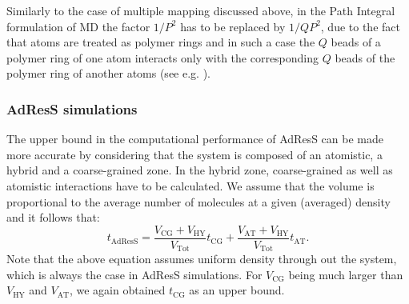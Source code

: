 \documentclass[a4paper,preprint,unsortedaddress]{revtex4-1}
\begin{document}
Similarly to the case of multiple mapping discussed above, in the Path Integral formulation of MD the factor $1/P^2$ has to be replaced by $1/QP^{2}$, due to the fact that atoms are treated as polymer rings and in such a case the $Q$ beads of a polymer ring of one atom interacts only with the corresponding $Q$ beads of the polymer ring of another atoms (see e.g. \cite{PI}).



\subsubsection{AdResS simulations}
The upper bound in the computational performance of AdResS  can be made more accurate by considering that the system is composed of an atomistic, a hybrid and a coarse-grained zone.
In the hybrid zone, coarse-grained as well as atomistic interactions have to be calculated.
We assume that the volume is proportional to the average number of molecules at a given (averaged) density and it follows that:
\begin{equation}
  t_\text{AdResS} = \frac{V_\text{CG}+V_\text{HY}}{V_\text{Tot}}t_\text{CG}+\frac{V_\text{AT}+V_\text{HY}}{V_\text{Tot}} t_\text{AT}.
  \label{equ:t_pieces}
\end{equation}
{Note that the above equation assumes uniform density through out the system, which is always the case in AdResS simulations.}
For $V_\text{CG}$ being much larger than $V_\text{HY}$ and $V_\text{AT}$, we again obtained $t_\text{CG}$ as an upper bound.
\end{document}

